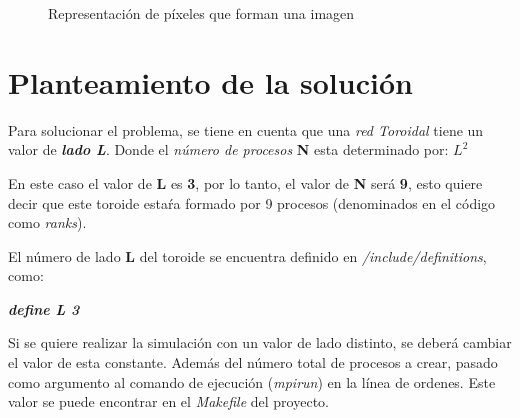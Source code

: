 \documentclass[11pt]{article}
\begin{document}
\begin{figure}[H]
  \centering
  \caption{Representación de píxeles que forman una imagen}
  \label{fig:intro}
\end{figure}

\clearpage


\section{Planteamiento de la solución}
Para solucionar el problema, se tiene en cuenta que una \textit{red Toroidal} tiene un valor de \textit{\textbf{lado L}}.
Donde el \textit{número de procesos} \textbf{N} esta determinado por: \textbf{$L^{2}$}

En este caso el valor de \textbf{L} es \textbf{3}, por lo tanto, el valor de \textbf{N} será \textbf{9}, esto quiere decir que este toroide estaŕa formado por 9 procesos (denominados en el código como \textit{ranks}).

El número de lado \textbf{L} del toroide se encuentra definido en \textit{/include/definitions}, como:

\textit{\textbf{define L 3}}

Si se quiere realizar la simulación con un valor de lado distinto, se deberá cambiar el valor de esta constante. Además del número total de procesos a crear, pasado como argumento al comando de ejecución (\textit{mpirun}) en la línea de ordenes. Este valor se puede encontrar en el \textit{Makefile} del proyecto.
\end{document}
